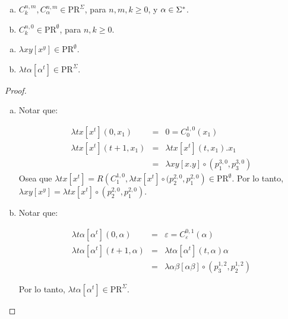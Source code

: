   \begin{lemma}
    \begin{enumerate}[a)]
      \item $C_{k}^{n,m}, C_{\alpha}^{n,m} \in \mathrm{PR}^{\Sigma}$, para $n, m, k \geq 0$, y $\alpha \in \Sigma^{\ast}$.
      \item $C_{k}^{n,0} \in \mathrm{PR}^{\emptyset}$, para $n, k \geq 0$.
    \end{enumerate}
  \end{lemma}

  \begin{lemma}
    \begin{enumerate}[a)]
      \item $\lambda xy \left[x^{y}\right] \in \mathrm{PR}^{\emptyset}$.
      \item $\lambda t\alpha \left[\alpha^{t}\right] \in \mathrm{PR}^{\Sigma}$.
    \end{enumerate}
  \end{lemma}
  \begin{proof}
    \begin{enumerate}[a)]
      \item Notar que:

        \begin{eqnarray*}
          \lambda tx \left[x^{t}\right](0, x_{1}) &=& 0 = C_{0}^{1,0}(x_{1}) \\
          \lambda tx \left[x^{t}\right](t+1, x_{1}) &=& \lambda tx \left[x^{t}\right](t, x_{1}) . x_{1} \\
          &=& \lambda xy \left[x.y\right] \circ (p_{1}^{3,0}, p_{3}^{3,0})
        \end{eqnarray*}
        \PN Osea que $\lambda tx \left[x^{t}\right] = R\left(C_{1}^{1,0}, \lambda tx \left[x^{t}\right] \circ
        (p_{2}^{2,0}, p_{1}^{2,0}\right) \in \mathrm{PR}^{\emptyset}$.
        \PN Por lo tanto, $\lambda xy \left[x^{y}\right] = \lambda tx \left[x^{t}\right] \circ (p_{2}^{2,0},
        p_{1}^{2,0})$.

      \item Notar que:

      \begin{eqnarray*}
        \lambda t\alpha \left[\alpha^{t}\right](0, \alpha) &=& \varepsilon = C_{\varepsilon}^{0,1}(\alpha) \\
        \lambda t\alpha \left[\alpha^{t}\right](t+1, \alpha) &=& \lambda t\alpha \left[\alpha^{t}\right](t,
          \alpha) \alpha \\
        &=& \lambda \alpha\beta \left[\alpha\beta \right] \circ \left(p_{3}^{1,2}, p_{2}^{1,2}\right)
      \end{eqnarray*}

      \PN Por lo tanto, $\lambda t\alpha \left[\alpha^{t}\right] \in \mathrm{PR}^{\Sigma}$.
    \end{enumerate}
  \end{proof}

